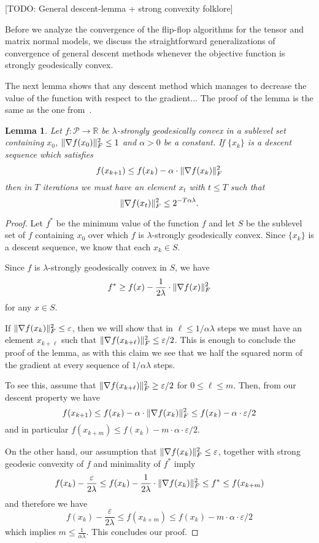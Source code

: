 \documentclass{article}
\newtheorem{lemma}[theorem]{Lemma}
\DeclarePairedDelimiter{\norm}{\lVert}{\rVert}
\newcommand{\R}{{\mathbb{R}}}
\newcommand\SPD{\mathcal{P}}
\newcommand{\TODO}[1]{{\color{blue}[TODO: #1]}}
\begin{document}
\TODO{General descent-lemma + strong convexity folklore}

Before we analyze the convergence of the flip-flop algorithms for the tensor and matrix normal models, we discuss the straightforward generalizations of convergence of general descent methods whenever the objective function is strongly geodesically convex.

The next lemma shows that any descent method which manages to decrease the value of the function with respect to the gradient...
The proof of the lemma is the same as the one from~\cite[Lemma 4.8]{FM20}.

\begin{lemma}\label{lem:descent-sublevel-set}
	Let $f : \SPD \rightarrow \R$ be $\lambda$-strongly geodesically convex in a sublevel set containing $x_0$, $\norm{\nabla f(x_0)}_F^2 \leq 1$ and $\alpha > 0$ be a constant.
	If $\{x_k\}$ is a descent sequence which satisfies 
	$$ f(x_{k+1}) \leq f(x_k) - \alpha \cdot \norm{\nabla f(x_k)}^2_F $$
	then in $T$ iterations we must have an element $x_t$ with $t\leq T$ such that
	$$ \norm{\nabla f(x_t)}^2_F \leq 2^{-T \alpha \lambda}.   $$
\end{lemma}

\begin{proof}
	Let $f^*$ be the minimum value of the function $f$ and let $S$ be the sublevel set of $f$ containing $x_0$ over which $f$ is $\lambda$-strongly geodesically convex. Since $\{x_k\}$ is a descent sequence, we know that each $x_k \in S$.
	
	Since $f$ is $\lambda$-strongly geodesically convex in $S$, we have 
	$$ f^* \geq f(x) - \frac{1}{2\lambda} \cdot \norm{\nabla f(x)}_F^2 $$
	for any $x \in S$.
	
	If $\norm{\nabla f(x_k)}_F^2 \leq \varepsilon$, then we will show that in $\ell \leq 1/\alpha \lambda$ steps we must have an element $x_{k+\ell}$ such that $\norm{\nabla f(x_{k + \ell})}_F^2 \leq \varepsilon/2$. This is enough to conclude the proof of the lemma, as with this claim we see that we half the squared norm of the gradient at every sequence of $1/\alpha \lambda$ steps.
	
	To see this, assume that $\norm{\nabla f(x_{k+\ell})}_F^2 \geq \varepsilon/2$ for $0 \leq \ell \leq m$. Then, from our descent property we have
	$$ f(x_{k+1}) \leq f(x_k) - \alpha \cdot \norm{\nabla f(x_k)}^2_F \leq f(x_k) - \alpha \cdot \varepsilon/2$$
	and in particular $f(x_{k + m}) \leq f(x_k) - m \cdot \alpha \cdot \varepsilon/2$. 
	
	On the other hand, our assumption that $\norm{\nabla f(x_k)}_F^2 \leq \varepsilon$, together with strong geodesic convexity of $f$ and minimality of $f^*$ imply 
	$$ f(x_{k}) - \frac{\varepsilon}{2\lambda} \leq f(x_{k}) - \frac{1}{2\lambda} \cdot \norm{\nabla f(x_k)}_F^2 \leq f^* \leq f(x_{k+m}) $$ 
	and therefore we have
	$$ f(x_{k}) - \frac{\varepsilon}{2\lambda} \leq f(x_{k + m}) \leq f(x_k) - m \cdot \alpha \cdot \varepsilon/2 $$
	which implies $m \leq \frac{1}{\alpha \lambda}$. This concludes our proof.
\end{proof}
\end{document}
